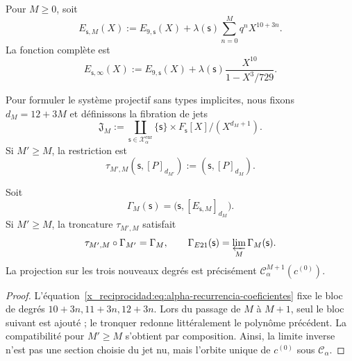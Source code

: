 Pour \(M\geq0\), soit
\begin{equation}
 E_{\mathsf s,M}(X):=E_{9,\mathsf s}(X)
 +\lambda(\mathsf s)\sum_{n=0}^{M}q^nX^{10+3n}.
 \label{x_reciprocidad:eq:alpha-truncamientos-completos}
\end{equation}
La fonction complète est
\begin{equation}
 E_{\mathsf s,\infty}(X)
 :=E_{9,\mathsf s}(X)
 +\lambda(\mathsf s)\frac{X^{10}}{1-X^3/729}.
 \label{x_reciprocidad:eq:alpha-funcion-completa-explicita}
\end{equation}

Pour formuler le système projectif sans types implicites, nous fixons \(d_M=12+3M\) et définissons la fibration de jets
\begin{equation}
 \mathfrak J_M:=
 \coprod_{\mathsf s\in\mathcal X_\alpha^{\mathrm{enr}}}
 \{\mathsf s\}\times F_{\mathsf s}[X]/(X^{d_M+1}).
 \label{x_reciprocidad:eq:alpha-espacio-jets-rev08}
\end{equation}
Si \(M'\ge M\), la restriction est
\begin{equation}
 \tau_{M',M}(\mathsf s,[P]_{d_{M'}})
 :=(\mathsf s,[P]_{d_M}).
 \label{x_reciprocidad:eq:alpha-truncamiento-jets-rev08}
\end{equation}

\begin{proposition}
\label{x_reciprocidad:prop:alpha-naturalidad-recurrencia-explicita}
Soit
\[
 \Gamma_M(\mathsf s)
 =\bigl(\mathsf s,[E_{\mathsf s,M}]_{d_M}\bigr).
\]
Si \(M'\geq M\), la troncature \(\tau_{M',M}\) satisfait
\begin{equation}
 \tau_{M',M}\circ\Gamma_{M'}=\Gamma_M,
 \qquad
 \Gamma_{E21}(\mathsf s)=\varprojlim_M\Gamma_M(\mathsf s).
 \label{x_reciprocidad:eq:alpha-naturalidad-explicita}
\end{equation}
La projection sur les trois nouveaux degrés est précisément
\(\mathcal C_\alpha^{M+1}(c^{(0)})\).
\end{proposition}

\begin{proof}
L'équation~\eqref{x_reciprocidad:eq:alpha-recurrencia-coeficientes} fixe le bloc de degrés \(10+3n,11+3n,12+3n\). Lors du passage de \(M\) à \(M+1\), seul le bloc suivant est ajouté ; le tronquer redonne littéralement le polynôme précédent. La compatibilité pour \(M'\geq M\) s'obtient par composition. Ainsi, la limite inverse n'est pas une section choisie du jet nu, mais l'orbite unique de \(c^{(0)}\) sous \(\mathcal C_\alpha\).
\end{proof}

